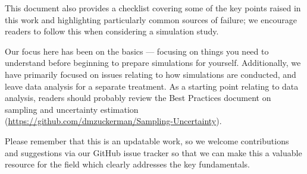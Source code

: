 \documentclass[9pt,bestpractices]{livecoms}
\begin{document}
This document also provides a checklist covering some of the key points raised in this work and highlighting particularly common sources of failure; we encourage readers to follow this when considering a simulation study.

Our focus here has been on the basics --- focusing on things you need to understand before beginning to prepare simulations for yourself.
Additionally, we have primarily focused on issues relating to how simulations are conducted, and leave data analysis for a separate treatment.
As a starting point relating to data analysis, readers should probably review the Best Practices document on sampling and uncertainty estimation (\url{https://github.com/dmzuckerman/Sampling-Uncertainty}).

Please remember that this is an updatable work, so we welcome contributions and suggestions via our GitHub issue tracker so that we can make this a valuable resource for the field which clearly addresses the key fundamentals.



\nocite{*}
{}
\end{document}
